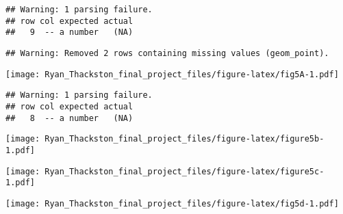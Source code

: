 \documentclass[
]{article}
\begin{document}
\begin{verbatim}
## Warning: 1 parsing failure.
## row col expected actual
##   9  -- a number   (NA)
\end{verbatim}

\begin{verbatim}
## Warning: Removed 2 rows containing missing values (geom_point).
\end{verbatim}

\texttt{[image: Ryan\_Thackston\_final\_project\_files/figure-latex/fig5A-1.pdf]}

\begin{verbatim}
## Warning: 1 parsing failure.
## row col expected actual
##   8  -- a number   (NA)
\end{verbatim}

\texttt{[image: Ryan\_Thackston\_final\_project\_files/figure-latex/figure5b-1.pdf]}

\texttt{[image: Ryan\_Thackston\_final\_project\_files/figure-latex/figure5c-1.pdf]}

\texttt{[image: Ryan\_Thackston\_final\_project\_files/figure-latex/fig5d-1.pdf]}
\end{document}
